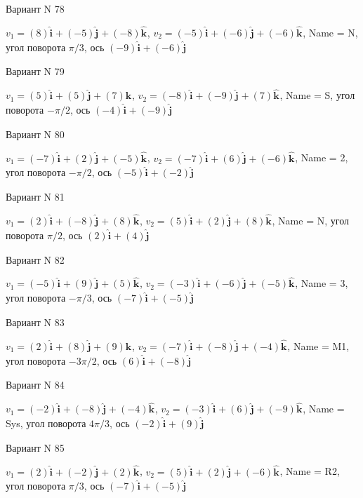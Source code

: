\documentclass[11pt]{report}
\begin{document}
Вариант N 78

$v_1 = (8)\mathbf{\hat{i}_{}} + (-5)\mathbf{\hat{j}_{}} + (-8)\mathbf{\hat{k}_{}}$, $v_2 = (-5)\mathbf{\hat{i}_{}} + (-6)\mathbf{\hat{j}_{}} + (-6)\mathbf{\hat{k}_{}}$, Name = N, угол поворота $\pi / 3$, ось $(-9)\mathbf{\hat{i}_{}} + (-6)\mathbf{\hat{j}_{}}$

Вариант N 79

$v_1 = (5)\mathbf{\hat{i}_{}} + (5)\mathbf{\hat{j}_{}} + (7)\mathbf{\hat{k}_{}}$, $v_2 = (-8)\mathbf{\hat{i}_{}} + (-9)\mathbf{\hat{j}_{}} + (7)\mathbf{\hat{k}_{}}$, Name = S, угол поворота $- \pi / 2$, ось $(-4)\mathbf{\hat{i}_{}} + (-9)\mathbf{\hat{j}_{}}$

Вариант N 80

$v_1 = (-7)\mathbf{\hat{i}_{}} + (2)\mathbf{\hat{j}_{}} + (-5)\mathbf{\hat{k}_{}}$, $v_2 = (-7)\mathbf{\hat{i}_{}} + (6)\mathbf{\hat{j}_{}} + (-6)\mathbf{\hat{k}_{}}$, Name = 2, угол поворота $- \pi / 2$, ось $(-5)\mathbf{\hat{i}_{}} + (-2)\mathbf{\hat{j}_{}}$

Вариант N 81

$v_1 = (2)\mathbf{\hat{i}_{}} + (-8)\mathbf{\hat{j}_{}} + (8)\mathbf{\hat{k}_{}}$, $v_2 = (5)\mathbf{\hat{i}_{}} + (2)\mathbf{\hat{j}_{}} + (8)\mathbf{\hat{k}_{}}$, Name = N, угол поворота $\pi / 2$, ось $(2)\mathbf{\hat{i}_{}} + (4)\mathbf{\hat{j}_{}}$

Вариант N 82

$v_1 = (-5)\mathbf{\hat{i}_{}} + (9)\mathbf{\hat{j}_{}} + (5)\mathbf{\hat{k}_{}}$, $v_2 = (-3)\mathbf{\hat{i}_{}} + (-6)\mathbf{\hat{j}_{}} + (-5)\mathbf{\hat{k}_{}}$, Name = 3, угол поворота $- \pi / 3$, ось $(-7)\mathbf{\hat{i}_{}} + (-5)\mathbf{\hat{j}_{}}$

Вариант N 83

$v_1 = (2)\mathbf{\hat{i}_{}} + (8)\mathbf{\hat{j}_{}} + (9)\mathbf{\hat{k}_{}}$, $v_2 = (-7)\mathbf{\hat{i}_{}} + (-8)\mathbf{\hat{j}_{}} + (-4)\mathbf{\hat{k}_{}}$, Name = M1, угол поворота $- 3 \pi / 2$, ось $(6)\mathbf{\hat{i}_{}} + (-8)\mathbf{\hat{j}_{}}$

Вариант N 84

$v_1 = (-2)\mathbf{\hat{i}_{}} + (-8)\mathbf{\hat{j}_{}} + (-4)\mathbf{\hat{k}_{}}$, $v_2 = (-3)\mathbf{\hat{i}_{}} + (6)\mathbf{\hat{j}_{}} + (-9)\mathbf{\hat{k}_{}}$, Name = Sys, угол поворота $4 \pi / 3$, ось $(-2)\mathbf{\hat{i}_{}} + (9)\mathbf{\hat{j}_{}}$

Вариант N 85

$v_1 = (2)\mathbf{\hat{i}_{}} + (-2)\mathbf{\hat{j}_{}} + (2)\mathbf{\hat{k}_{}}$, $v_2 = (5)\mathbf{\hat{i}_{}} + (2)\mathbf{\hat{j}_{}} + (-6)\mathbf{\hat{k}_{}}$, Name = R2, угол поворота $\pi / 3$, ось $(-7)\mathbf{\hat{i}_{}} + (-5)\mathbf{\hat{j}_{}}$
\end{document}
